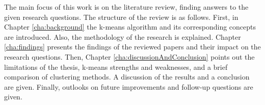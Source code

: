 The main focus of this work is on the literature review, finding answers to the given research questions.
The structure of the review is as follows.
First, in Chapter \ref{cha:background} the k-means algorithm and its corresponding concepts are introduced.
Also, the methodology of the research is explained.
Chapter \ref{cha:findings} presents the findings of the reviewed papers and their impact on the research questions.
Then, Chapter \ref{cha:discussionAndConclusion} points out the limitations of the thesis, k-means strengths and weaknesses, and a brief comparison of clustering methods.
A discussion of the results and a conclusion are given.
Finally, outlooks on future improvements and follow-up questions are given.